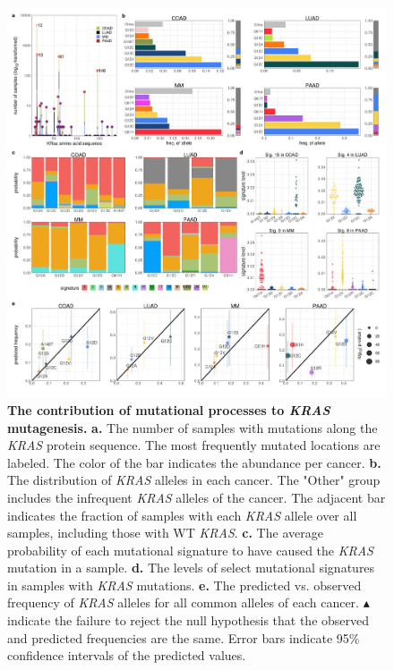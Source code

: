 \documentclass[english, 10pt, letterpaper]{article}
\newcommand{\KRAS}{\emph{KRAS}}
\begin{document}
\begin{figure}[p]
\centering
\includegraphics[width=\textwidth]{figures/Fig_1.jpeg}
\caption{
    \textbf{The contribution of mutational processes to \KRAS{} mutagenesis.}
    \textbf{a.} The number of samples with mutations along the \KRAS{} protein sequence. The most frequently mutated locations are labeled. The color of the bar indicates the abundance per cancer. 
    \textbf{b.} The distribution of \KRAS{} alleles in each cancer. The "Other" group includes the infrequent \KRAS{} alleles of the cancer. The adjacent bar indicates the fraction of samples with each \KRAS{} allele over all samples, including those with WT \KRAS{}.
    \textbf{c.} The average probability of each mutational signature to have caused the \KRAS{} mutation in a sample.
    \textbf{d.} The levels of select mutational signatures in samples with \KRAS{} mutations.
    \textbf{e.} The predicted vs. observed frequency of \KRAS{} alleles for all common alleles of each cancer. $\blacktriangle$ indicate the failure to reject the null hypothesis that the observed and predicted frequencies are the same. Error bars indicate 95\% confidence intervals of the predicted values.
}
\label{fig:mutational-signatures-main}
\end{figure}
\end{document}
